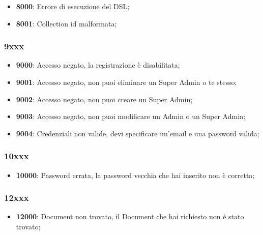 \begin{itemize}

	\item \textbf{8000}: Errore di esecuzione del DSL;
	\item \textbf{8001}: Collection id malformata; 

\end{itemize}

\subsubsection{9xxx}

\begin{itemize}

	\item \textbf{9000}: Accesso negato, la registrazione è disabilitata;
	\item \textbf{9001}: Accesso negato, non puoi eliminare un Super Admin o te stesso;
	\item \textbf{9002}: Accesso negato, non puoi creare un Super Admin;
	\item \textbf{9003}: Accesso negato, non puoi modificare un Admin o un Super Admin;
	\item \textbf{9004}: Credenziali non valide, devi specificare un'email e una password valida;

\end{itemize}

\subsubsection{10xxx}

\begin{itemize}

	\item \textbf{10000}: Password errata, la password vecchia che hai inserito non è corretta;

\end{itemize}

\subsubsection{12xxx}

\begin{itemize}

	\item \textbf{12000}: Document non trovato, il Document che hai richiesto non è stato trovato;

\end{itemize}

